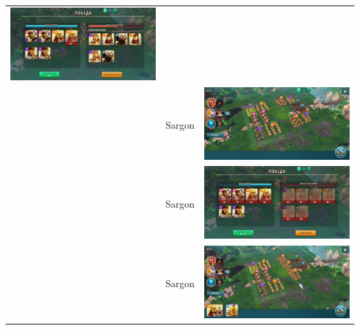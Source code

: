 \begin{longtable}{|c|c|c|}
    \includegraphics[width=0.75\linewidth]{./parts/media/TreasureHunt/34/sargon/photo_2022-04-07_10-08-16.jpg} \\
    & Sargon &
    \includegraphics[width=0.75\linewidth]{./parts/media/TreasureHunt/34/sargon/photo_2022-04-07_10-08-19.jpg} \\
    & Sargon &
    \includegraphics[width=0.75\linewidth]{./parts/media/TreasureHunt/34/sargon/photo_2022-04-07_10-08-23.jpg} \\
    & Sargon &
    \includegraphics[width=0.75\linewidth]{./parts/media/TreasureHunt/34/sargon/photo_2022-04-07_10-08-04.jpg} \\

\end{longtable}
